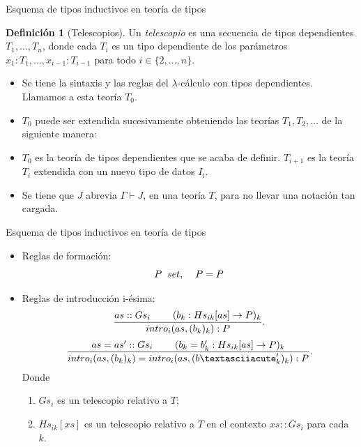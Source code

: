 \documentclass[dvipsnames, 8pt]{beamer} %
\theoremstyle{plain}
\theoremstyle{definition}
\newtheorem{defi}{Definición}
\begin{document}
\begin{frame}{Esquema de tipos inductivos en teoría de tipos}
    \begin{defi}[Telescopios]
        Un \emph{telescopio} es una secuencia de tipos dependientes \(T_{1}, \ldots, T_{n}\), donde cada \(T_{i}\) es un tipo dependiente de los parámetros \(x_{1}:T_{1}, \ldots, x_{i-1}:T_{i-1}\) para todo \(i \in \{2, \ldots, n\}\).
    \end{defi}\pause
    \begin{itemize}
        \item Se tiene la sintaxis y las reglas del $\lambda$-cálculo con tipos dependientes. Llamamos a esta teoría $T_{0}$. \pause
        \item $T_{0}$ puede ser extendida sucesivamente obteniendo las teorías $T_{1}, T_{2}, \ldots$ de la siguiente manera:\pause
        \item $T_{0}$ es la teoría de tipos dependientes que se acaba de definir. $T_{i+1}$ es la teoría $T_{i}$ extendida con un nuevo tipo de datos $I_{i}$.\pause
        \item Se tiene que $J$ abrevia $\Gamma\vdash J$, en una teoría $T$, para no llevar una notación tan cargada.
    \end{itemize}
\end{frame}

\begin{frame}{Esquema de tipos inductivos en teoría de tipos}
    \begin{itemize}
    \item Reglas de formación:
    \[P \hspace{2mm} set, \hspace{4mm} P=P\]\pause
    \item Reglas de introducción i-ésima:
      $$\frac{as::Gs_{i} \hspace{8mm} (b_{k}:Hs_{ik}[as]\to P)_{k}}{intro_{i}(as,(b_{k})_{k}) :P}.$$
      $$\frac{as=as'::Gs_{i} \hspace{8mm} (b_{k}=b'_{k}:Hs_{ik}[as]\to P)_{k}}{intro_{i}(as,(b_{k})_{k}) = intro_{i}(as,(b´'_{k})_{k}) :P}.$$\pause
    Donde\pause
        \begin{enumerate}
            \item $Gs_{i}$ es un telescopio relativo a $T$;\pause
            \item $Hs_{ik}[xs]$ es un telescopio relativo a $T$ en el contexto $xs::Gs_{i}$ para cada $k$.
        \end{enumerate}
    \end{itemize}
\end{frame}
\end{document}
